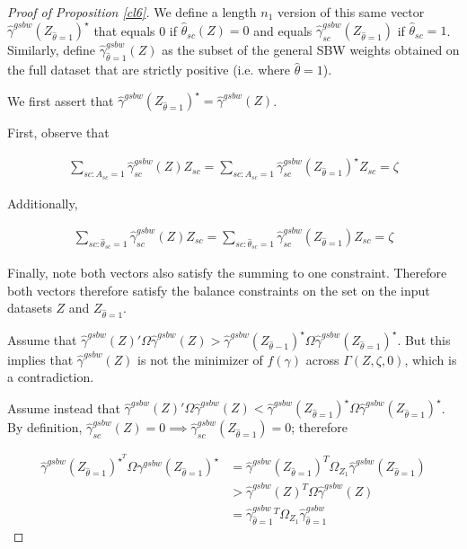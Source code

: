\begin{proof}[Proof of Proposition \ref{cl6}]
We define a length $n_1$ version of this same vector $\hat{\gamma}^{gsbw}(Z_{\hat{\theta} = 1})^\star$ that equals 0 if $\hat{\theta}_{sc}(Z) = 0$ and equals $\hat{\gamma}^{gsbw}_{sc}(Z_{\hat{\theta} = 1})$ if $\hat{\theta}_{sc} = 1$. Similarly, define $\hat{\gamma}^{gsbw}_{\hat{\theta} = 1}(Z)$ as the subset of the general SBW weights obtained on the full dataset that are strictly positive (i.e. where $\hat{\theta} = 1$).

We first assert that $\hat{\gamma}^{gsbw}(Z_{\hat{\theta} = 1})^\star  = \hat{\gamma}^{gsbw}(Z)$.

First, observe that 

\begin{align*}
\sum_{sc: A_{sc} = 1}\hat{\gamma}_{sc}^{gsbw}(Z) Z_{sc} = \sum_{sc: A_{sc} = 1}\hat{\gamma}^{gsbw}_{sc}(Z_{\hat{\theta} = 1})^\star Z_{sc} = \zeta \end{align*}

Additionally, 

\begin{align*}
 \sum_{sc: \hat{\theta}_{sc} = 1}\hat{\gamma}_{sc}^{gsbw}(Z) Z_{sc} = \sum_{sc: \hat{\theta}_{sc} = 1}\hat{\gamma}_{sc}^{gsbw}(Z_{\hat{\theta} = 1}) Z_{sc} = \zeta   
\end{align*}

Finally, note both vectors also satisfy the summing to one constraint. Therefore both vectors therefore satisfy the balance constraints on the set on the input datasets $Z$ and $Z_{\hat{\theta} = 1}$. 

Assume that $\hat{\gamma}^{gsbw}(Z)'\Omega\hat{\gamma}^{gsbw}(Z) > \hat{\gamma}^{gsbw}(Z_{\hat{\theta} - 1})^\star \Omega\hat{\gamma}^{gsbw}(Z_{\hat{\theta} = 1})^\star$. But this implies that $\hat{\gamma}^{gsbw}(Z)$ is not the minimizer of $f(\gamma)$ across $\Gamma(Z, \zeta, 0)$, which is a contradiction. 

Assume instead that $\hat{\gamma}^{gsbw}(Z)'\Omega\hat{\gamma}^{gsbw}(Z) < \hat{\gamma}^{gsbw}(Z_{\hat{\theta} = 1})^\star \Omega\hat{\gamma}^{gsbw}(Z_{\hat{\theta} = 1})^\star$. By definition, $\hat{\gamma}^{gsbw}_{sc}(Z) = 0 \implies \hat{\gamma}^{gsbw}_{sc}(Z_{\hat{\theta} = 1}) = 0$; therefore 

\begin{align*}
\hat{\gamma}^{gsbw}(Z_{\hat{\theta} = 1})^\star^T\Omega\gamma^{gsbw}(Z_{\hat{\theta} = 1})^\star &= \hat{\gamma}^{gsbw}(Z_{\hat{\theta} = 1})^T\Omega_{Z_1}\hat{\gamma}^{gsbw}(Z_{\hat{\theta} = 1}) \\
&> \hat{\gamma}^{gsbw}(Z)^T\Omega\hat{\gamma}^{gsbw}(Z) \\
&= \hat{\gamma}^{gsbw}_{\hat{\theta} = 1}^T\Omega_{Z_1}\hat{\gamma}^{gsbw}_{\hat{\theta} = 1}    
\end{align*}


\end{proof}
